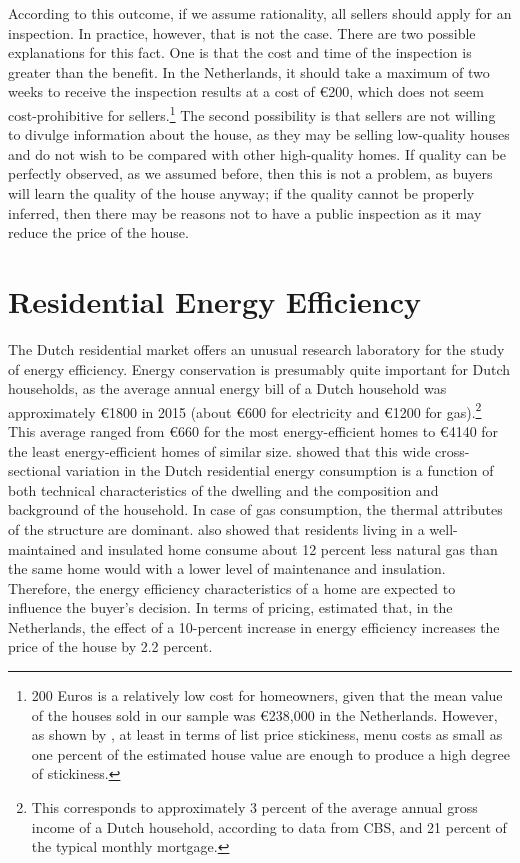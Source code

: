 \documentclass[12pt]{article}
\begin{document}
According to this outcome, if we assume rationality, all sellers should apply for an inspection. In practice, however, that is not the case. There are two possible explanations for this fact. One is that the cost and time of the inspection is greater than the benefit. In the Netherlands, it should take a maximum of two weeks to receive the inspection results at a cost of \euro 200, which does not seem cost-prohibitive for sellers.\footnote{200 Euros is a relatively low cost for homeowners, given that the mean value of the houses sold in our sample was \euro 238,000 in the Netherlands. However, as shown by \cite{merlo2015home}, at least in terms of list price stickiness, menu costs as small as one percent of the estimated house value are enough to produce a high degree of stickiness.} The second possibility is that sellers are not willing to divulge information about the house, as they may be selling low-quality houses and do not wish to be compared with other high-quality homes. If quality can be perfectly observed, as we assumed before, then this is not a problem, as buyers will learn the quality of the house anyway; if the quality cannot be properly inferred, then there may be reasons not to have a public inspection as it may reduce the price of the house.


\section{Residential Energy Efficiency}

The Dutch residential market offers an unusual research laboratory for the study of energy efficiency. Energy conservation is presumably quite important for Dutch households, as the average annual energy bill of a Dutch household was approximately  \euro{1800}  in 2015 (about  \euro{600} for electricity and  \euro{1200} for gas).\footnote{This corresponds to approximately 3 percent of the average annual gross income of a Dutch household, according to data from CBS, and 21 percent of the typical monthly mortgage.} This average ranged from \euro{660} for the most energy-efficient homes to \euro{4140} for the least energy-efficient homes of similar size. \cite{brounen2012residential} showed that this wide cross-sectional variation in the Dutch residential energy consumption is a function of both technical characteristics of the dwelling and the composition and background of the household. In case of gas consumption, the thermal attributes of the structure are dominant. \cite{brounen2012residential} also showed that residents living in a well-maintained and insulated home consume about 12 percent less natural gas than the same home would with a lower level of maintenance and insulation. Therefore, the energy efficiency characteristics of a home are expected to influence the buyer's decision. In terms of pricing, \cite{aydin2017information} estimated that, in the Netherlands, the effect of a 10-percent increase in energy efficiency increases the price of the house by 2.2 percent. 
\end{document}
